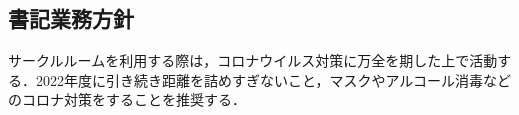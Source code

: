 \subsection*{書記業務方針}


サークルルームを利用する際は，コロナウイルス対策に万全を期した上で活動する．2022年度に引き続き距離を詰めすぎないこと，マスクやアルコール消毒などのコロナ対策をすることを推奨する．